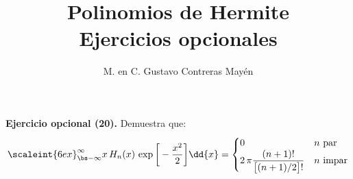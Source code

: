 
\title{Polinomios de Hermite \\[0.3em] \large{Ejercicios opcionales} \vspace{-3ex}}
\author{M. en C. Gustavo Contreras Mayén}
\date{ }


\vspace{-4cm}
\maketitle
\fontsize{14}{14}\selectfont

\noindent
\textbf{Ejercicio opcional (20).} Demuestra que:
\begin{align*}
\scaleint{6ex}_{\bs - \infty}^{\infty} x \, H_{n}(x) \, \exp \bigg[ - \dfrac{x^{2}}{2} \bigg] \dd{x} = \begin{cases}
0 & n \mbox{ par} \\
2 \, \pi \dfrac{(n + 1)!}{\big[ (n + 1)/2 \big]!} & n \mbox{ impar}
\end{cases}
\end{align*}
